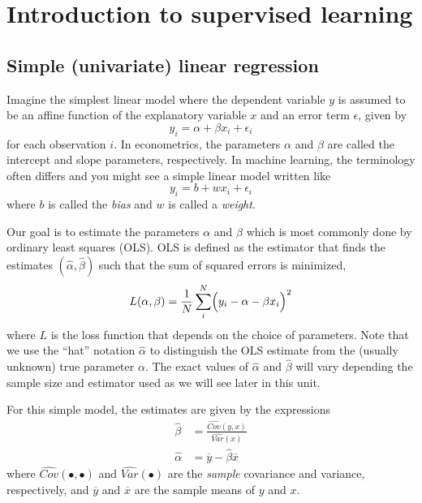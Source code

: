 \documentclass{scrartcl}
\begin{document}
    
    \maketitle
    \tableofcontents
    
    

    
    \hypertarget{introduction-to-supervised-learning}{%
\section{Introduction to supervised
learning}\label{introduction-to-supervised-learning}}

    \hypertarget{simple-univariate-linear-regression}{%
\subsection{Simple (univariate) linear
regression}\label{simple-univariate-linear-regression}}

Imagine the simplest linear model where the dependent variable \(y\) is
assumed to be an affine function of the explanatory variable \(x\) and
an error term \(\epsilon\), given by \[
y_i = \alpha + \beta x_i + \epsilon_i
\] for each observation \(i\). In econometrics, the parameters
\(\alpha\) and \(\beta\) are called the intercept and slope parameters,
respectively. In machine learning, the terminology often differs and you
might see a simple linear model written like \[
y_i = b + w x_i + \epsilon_i
\] where \(b\) is called the \emph{bias} and \(w\) is called a
\emph{weight}.

Our goal is to estimate the parameters \(\alpha\) and \(\beta\) which is
most commonly done by ordinary least squares (OLS). OLS is defined as
the estimator that finds the estimates
\((\widehat{\alpha}, \widehat{\beta})\) such that the sum of squared
errors is minimized, \[
L(\alpha, \beta) = \frac{1}{N}
    \sum_i^N \Bigl(y_i - \alpha - \beta x_i \Bigr)^2
\] where \(L\) is the loss function that depends on the choice of
parameters. Note that we use the ``hat'' notation \(\widehat{\alpha}\)
to distinguish the OLS estimate from the (usually unknown) true
parameter \(\alpha\). The exact values of \(\widehat{\alpha}\) and
\(\widehat{\beta}\) will vary depending the sample size and estimator
used as we will see later in this unit.

For this simple model, the estimates are given by the expressions \[
\begin{aligned}
\widehat{\beta} &= \frac{\widehat{Cov}(y,x)}{\widehat{Var}(x)} \\
\widehat{\alpha} &= \overline{y} - \widehat{\beta} \overline{x}
\end{aligned}
\] where \(\widehat{Cov}(\bullet,\bullet)\) and
\(\widehat{Var}(\bullet)\) are the \emph{sample} covariance and
variance, respectively, and \(\overline{y}\) and \(\overline{x}\) are
the sample means of \(y\) and \(x\).
\end{document}
